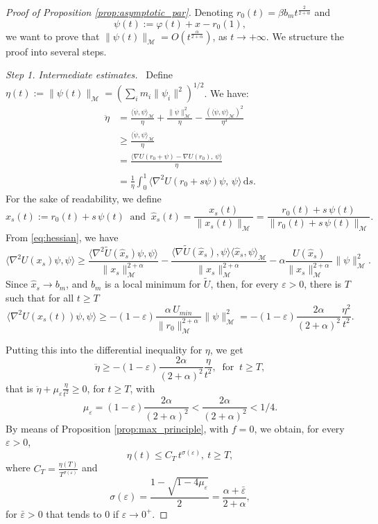 \documentclass[a4paper,10pt]{amsart}
\newcommand{\ud}{\mathrm{d}}
\theoremstyle{plain}
\theoremstyle{definition}
\numberwithin{equation}{section}
\numberwithin{thm}{section}
\begin{document}
\begin{proof}[Proof of Proposition \ref{prop:asymptotic_par}]
    Denoting $r_0(t) = \beta b_m t^{\frac{2}{2+\alpha}}$ and 
    \[
    \psi(t):=\varphi(t)+x-r_0(1),
    \]
    we want to prove that $\|\psi(t)\|_\mathcal{M}=O(t^\frac{\alpha}{2+\alpha})$, as $t \rightarrow+\infty$. We structure the proof into several steps.

    \smallskip
    \emph{Step 1. Intermediate estimates.} \ 
    Define $\eta(t):=\|\psi(t)\|_\mathcal{M}=\left(\sum_i m_i \|\psi_i\|^2\right)^{1/2}$. We have:
\[
\begin{split}
\ddot \eta &= \frac{\langle\ddot \psi, \psi\rangle_\mathcal{M}}{\eta} + \frac{\|\dot \psi\|_\mathcal{M}^2}{\eta} - \frac{\left(\langle \dot \psi, \psi\rangle_\mathcal{M}\right)^2}{\eta^3}
\\
&\ge \frac{\langle \ddot \psi, \psi\rangle_\mathcal{M}}{\eta}
\\
&=\frac{\langle \nabla U(r_0 + \psi) - \nabla U(r_0),\,\psi\rangle}{\eta}\\
& = \frac{1}{\eta} \int_{0}^{1}\langle\nabla^2 U(r_0+s\psi)\psi,\,\psi\rangle \, \ud s.
\end{split}
\]
For the sake of readability, we define
\[
x_s(t):=r_0(t)+s\,\psi(t) \ \mbox{ and } \ \hat x_s(t)=\frac{x_s(t)}{\|x_s(t)\|_{\mathcal M}}=\frac{r_0(t)+s\,\psi(t)}{\|r_0(t)+s\,\psi(t)\|_{\mathcal M}}.
\]
From \eqref{eq:hessian}, we have
\[
\langle\nabla^2 U(x_s)\psi, \psi\rangle \ge  \frac{\langle\nabla^2\tilde  U(\hat x_s)\psi,\psi\rangle}{\|x_s\|_{\mathcal M}^{2+\alpha}} - \frac{\langle  \nabla\tilde U(\hat x_s), \psi\rangle \langle \hat x_s, \psi\rangle_{\mathcal M}}{\|x_s\|_{\mathcal M}^{2+\alpha}} - \alpha\frac{U(\hat x_s)}{\|x_s\|_{\mathcal M}^{2+\alpha}}\|\psi\|_{\mathcal M}^2.
\]
Since $\hat x_s \to b_m$, and $b_m$ is a local minimum for $\tilde U$, then, for every $\varepsilon>0$, there is $T$ such that for all $t\ge T$
\[
\langle\nabla^2 U(x_s(t))\psi, \psi\rangle \ge -(1-\varepsilon) \frac{\alpha\,U_{min}}{\|r_0\|_{\mathcal M}^{2+\alpha}} \|\psi\|_\mathcal{M}^2 = -(1-\varepsilon)\frac{2\alpha}{(2+\alpha)^2}\frac{\eta^2}{ {t^2}}.
\]

Putting this into the differential inequality for $\eta$, we get
\[
\ddot\eta \ge  -(1-\varepsilon)\frac{2\alpha}{(2+\alpha)^2}\frac{\eta}{t^2}, \ \mbox{ for } \ t \ge T,
\]
that is $\ddot \eta + \mu_\varepsilon \frac{\eta}{t^2} \ge 0$, for $t \ge T$, with
\[
\mu_\varepsilon = (1-\varepsilon)\frac{2\alpha}{(2+\alpha)^2}< \frac{2\alpha}{(2+\alpha)^2}<1/4.
\]
By means of Proposition \ref{prop:max_principle}, with $f=0$, we obtain, for every $\varepsilon>0$,
\begin{equation}
    \label{eq:gamma_eps}
\eta(t) \le C_T\,t^{\sigma(\varepsilon)}, \ t \ge T,
\end{equation}
where $C_T=\frac{\eta(T)}{T^{\sigma(\varepsilon)}}$ and
\[
\sigma(\varepsilon) = \frac{1-\sqrt{1-4\mu_\varepsilon}}{2} = \frac{\alpha+\bar\varepsilon}{2+\alpha},
\]
for $\bar\varepsilon >0$ that tends to $0$ if $\varepsilon \to 0^+$.


\end{proof}
\end{document}
